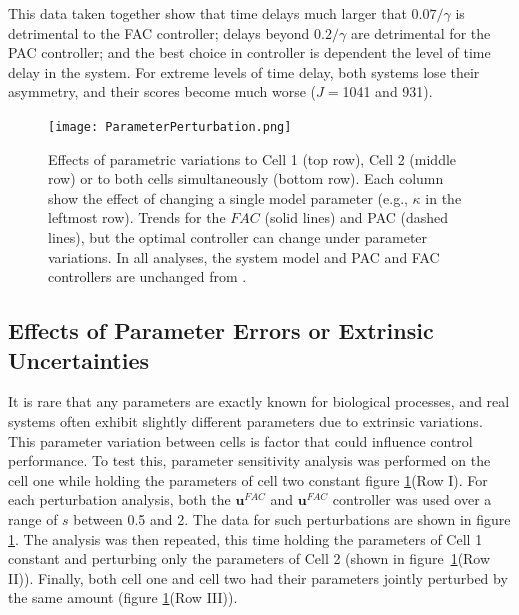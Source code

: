 \documentclass[12pt]{article}
\begin{document}
This data taken together show that time delays much larger that $0.07 / \gamma$ is detrimental to the FAC controller; delays beyond $0.2 / \gamma$ are detrimental for the PAC controller; and the best choice in controller is dependent the level of time delay in the system.  For extreme levels of time delay, both systems lose their asymmetry, and their scores become much worse ($J=$1041 and 931). 

\begin{figure}
\begin{center}
\texttt{[image: ParameterPerturbation.png]}
\caption{Effects of parametric variations to Cell 1 (top row), Cell 2 (middle row) or to both cells simultaneously (bottom row). Each column show the effect of changing a single model parameter (e.g., $\kappa$ in the leftmost row). Trends for the $FAC$ (solid lines) and PAC (dashed lines), but the optimal controller can change under parameter variations. In all analyses, the system model and PAC and FAC controllers are unchanged from \cite{May2021}.}
\label{Parameter}
\end{center}
\end{figure}

\subsection{Effects of Parameter Errors or Extrinsic Uncertainties}

It is rare that any parameters are exactly known for biological processes, and real systems often exhibit slightly different parameters due to extrinsic variations. This parameter variation between cells is factor that could influence control performance. To test this, parameter sensitivity analysis was performed on the cell one while holding the parameters of cell two constant figure \ref{Parameter}(Row I). For each perturbation analysis, both the $\mathbf{u}^{FAC}$ and $\mathbf{u}^{FAC}$ controller was used over a range of $s$ between 0.5 and 2. The data for such perturbations are shown in figure \ref{Parameter}. The analysis was then repeated, this time holding the parameters of Cell 1 constant and perturbing only the parameters of Cell 2  (shown in figure\ \ref{Parameter}(Row II)). Finally, both cell one and cell two had their parameters jointly perturbed by the same amount (figure \ref{Parameter}(Row III)).
\end{document}
